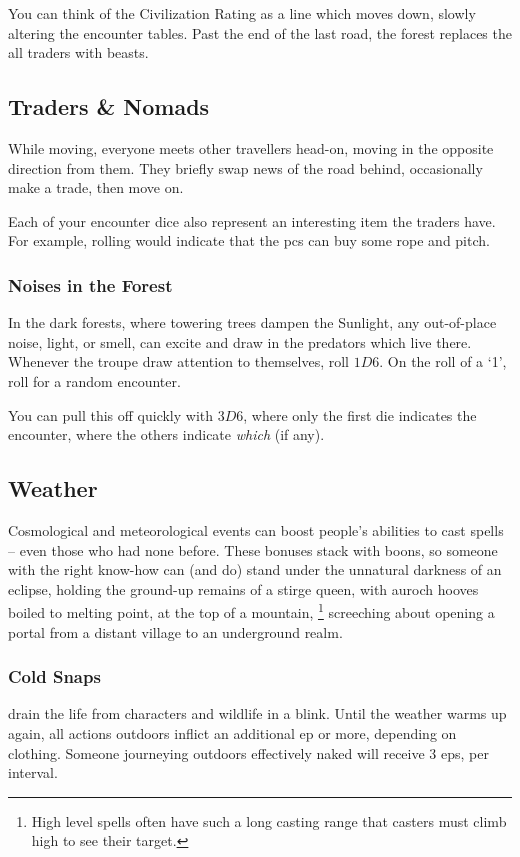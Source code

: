 \begin{multicols}{2}
You can think of the Civilization Rating as a line which moves down, slowly altering the encounter tables.
Past the end of the last road, the forest replaces the all traders with beasts.

\subsection{Traders \& Nomads}

While moving, everyone meets other travellers head-on, moving in the opposite direction from them.
They briefly swap news of the road behind, occasionally make a trade, then move on.

\encTraders

Each of your encounter dice also represent an interesting item the traders have.
For example, rolling  would indicate that the \glspl{pc} can buy some rope and pitch.

\subsubsection{Noises in the Forest}

In the dark forests, where towering trees dampen the Sunlight, any out-of-place noise, light, or smell, can excite and draw in the predators which live there.
Whenever the troupe draw attention to themselves, roll $1D6$.
On the roll of a `1', roll for a random encounter.

You can pull this off quickly with $3D6$, where only the first die indicates the encounter, where the others indicate \emph{which} (if any).

\subsection{Weather}
\label{weather}
Cosmological and meteorological events can boost people's abilities to cast spells -- even those who had none before.
These bonuses stack with \glspl{boon}, so someone with the right know-how can (and do) stand under the unnatural darkness of an eclipse, holding the ground-up remains of a stirge queen, with auroch hooves boiled to melting point, at the top of a mountain,%
\footnote{High level spells often have such a long casting range that casters must climb high to see their target.}
screeching about opening a portal from a distant \gls{village} to an underground realm.

\subsubsection{Cold Snaps}
drain the life from characters and wildlife in a blink.
Until the weather warms up again, all actions outdoors inflict an additional \gls{ep} or more, depending on clothing.
Someone journeying outdoors effectively naked will receive 3 \glspl{ep}, per \gls{interval}.


\end{multicols}
